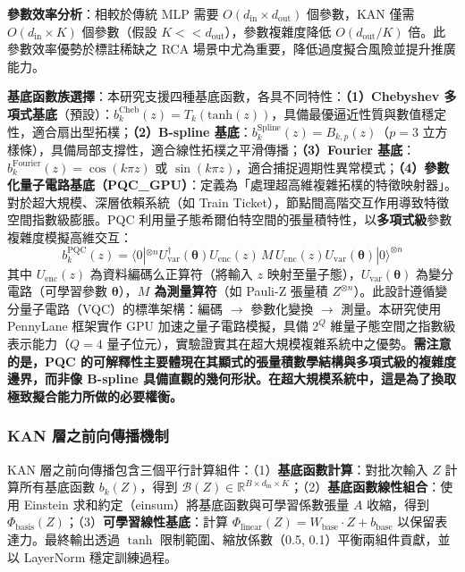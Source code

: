 \documentclass[10pt,a4paper,twocolumn]{article}
\begin{document}
\textbf{參數效率分析}：相較於傳統 MLP 需要 $O(d_{\text{in}} \times d_{\text{out}})$ 個參數，KAN 僅需 $O(d_{\text{in}} \times K)$ 個參數（假設 $K << d_{\text{out}}$），參數複雜度降低 $O(d_{\text{out}}/K)$ 倍。此參數效率優勢於標註稀缺之 RCA 場景中尤為重要，降低過度擬合風險並提升推廣能力。

\textbf{基底函數族選擇}：本研究支援四種基底函數，各具不同特性：\textbf{（1）Chebyshev 多項式基底}（預設）：$b_k^{\text{Cheb}}(z) = T_k(\text{tanh}(z))$，具備最優逼近性質與數值穩定性，適合扇出型拓樸；\textbf{（2）B-spline 基底}：$b_k^{\text{Spline}}(z) = B_{k,p}(z)$（$p=3$ 立方樣條），具備局部支撐性，適合線性拓樸之平滑傳播；\textbf{（3）Fourier 基底}：$b_k^{\text{Fourier}}(z) = \cos(k \pi z)$ 或 $\sin(k \pi z)$，適合捕捉週期性異常模式；\textbf{（4）參數化量子電路基底（PQC\_GPU）}：定義為「處理超高維複雜拓樸的特徵映射器」。對於超大規模、深層依賴系統（如 Train Ticket），節點間高階交互作用導致特徵空間指數級膨脹。PQC 利用量子態希爾伯特空間的張量積特性，以\textbf{多項式級}參數複雜度模擬高維交互：
\begin{equation}
b_k^{\text{PQC}}(z) = \langle 0|^{\otimes n} U^\dagger_{\text{var}}(\boldsymbol{\theta}) U_{\text{enc}}(z) \, M \, U_{\text{enc}}(z) U_{\text{var}}(\boldsymbol{\theta}) |0\rangle^{\otimes n}
\end{equation}
其中 $U_{\text{enc}}(z)$ 為資料編碼么正算符（將輸入 $z$ 映射至量子態），$U_{\text{var}}(\boldsymbol{\theta})$ 為變分電路（可學習參數 $\boldsymbol{\theta}$），\textbf{$M$ 為測量算符}（如 Pauli-Z 張量積 $Z^{\otimes n}$）。此設計遵循變分量子電路（VQC）的標準架構：編碼 $\rightarrow$ 參數化變換 $\rightarrow$ 測量。本研究使用 PennyLane 框架實作 GPU 加速之量子電路模擬，具備 $2^Q$ 維量子態空間之指數級表示能力（$Q=4$ 量子位元），實驗證實其在超大規模複雜系統中之優勢。\textbf{需注意的是，PQC 的可解釋性主要體現在其顯式的張量積數學結構與多項式級的複雜度邊界，而非像 B-spline 具備直觀的幾何形狀。在超大規模系統中，這是為了換取極致擬合能力所做的必要權衡。}

\subsubsection{KAN 層之前向傳播機制}

KAN 層之前向傳播包含三個平行計算組件：（1）\textbf{基底函數計算}：對批次輸入 $Z$ 計算所有基底函數 $b_k(Z)$，得到 $\mathcal{B}(Z) \in \mathbb{R}^{B \times d_{\text{in}} \times K}$；（2）\textbf{基底函數線性組合}：使用 Einstein 求和約定（einsum）將基底函數與可學習係數張量 $A$ 收縮，得到 $\Phi_{\text{basis}}(Z)$；（3）\textbf{可學習線性基底}：計算 $\Phi_{\text{linear}}(Z) = W_{\text{base}} \cdot Z + b_{\text{base}}$ 以保留表達力。最終輸出透過 $\tanh$ 限制範圍、縮放係數（0.5, 0.1）平衡兩組件貢獻，並以 LayerNorm 穩定訓練過程。
\end{document}
